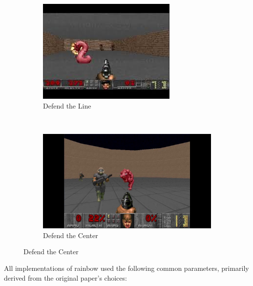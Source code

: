 \documentclass[letterpaper]{article}
\begin{document}
	\begin{figure}[h!]
		\centering
		\begin{subfigure}[b]{0.2\textwidth}
			\includegraphics[width=\textwidth]{DefendTheLine.jpg}
			\caption{Defend the Line}
			\label{fig:Line}
		\end{subfigure}
		~ %
		\begin{subfigure}[b]{0.2\textwidth}
			\includegraphics[width=\textwidth]{DefendTheCenter.jpg}
			\caption{Defend the Center}
			\label{fig:Center}
		\end{subfigure}
	\end{figure}

	All implementations of rainbow used the following common parameters, primarily derived from the original paper's choices:
	
\end{document}
